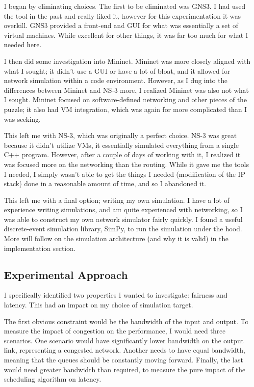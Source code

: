 \documentclass[conference]{IEEEtran}
\begin{document}
I began by eliminating choices.
The first to be eliminated was GNS3.
I had used the tool in the past and really liked it, however for this experimentation it was overkill.
GNS3 provided a front-end and GUI for what was essentially a set of virtual machines.
While excellent for other things, it was far too much for what I needed here.

I then did some investigation into Mininet.
Mininet was more closely aligned with what I sought; it didn't use a GUI or have a lot of bloat, and it allowed for
network simulation within a code environment.
However, as I dug into the differences between Mininet and NS-3 more, I realized Mininet was also not what I sought.
Mininet focused on software-defined networking and other pieces of the puzzle; it also had VM integration, which was again
for more complicated than I was seeking.

This left me with NS-3, which was originally a perfect choice.
NS-3 was great because it didn't utilize VMs, it essentially simulated everything from a single C++ program.
However, after a couple of days of working with it, I realized it was focused more on the networking than the routing.
While it gave me the tools I needed, I simply wasn't able to get the things I needed (modification of the IP stack) done
in a reasonable amount of time, and so I abandoned it.

This left me with a final option; writing my own simulation.
I have a lot of experience writing simulations, and am quite experienced with networking, so I was able to construct my own
network simulator fairly quickly.
I found a useful discrete-event simulation library, SimPy, to run the simulation under the
hood.
More will follow on the simulation architecture (and why it is valid) in the implementation section.

    \subsection{Experimental Approach}
I specifically identified two properties I wanted to investigate: fairness and latency.
This had an impact on my choice of simulation target.

The first obvious constraint would be the bandwidth of the input and output.
To measure the impact of congestion on the performance, I would need three scenarios.
One scenario would have significantly lower bandwidth on the output link, representing a congested network.
Another needs to have equal bandwidth, meaning that the queues should be constantly moving forward.
Finally, the last would need greater bandwidth than required, to measure the pure impact of the scheduling algorithm on latency.
\end{document}
